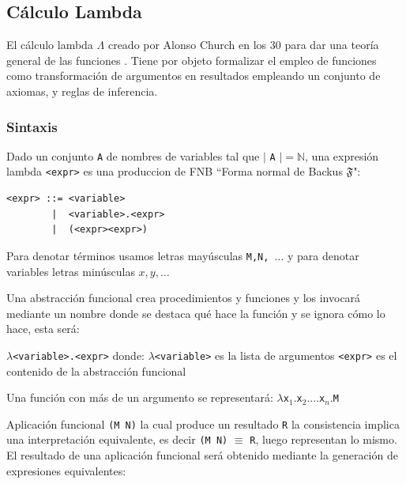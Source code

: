 \subsection{Cálculo Lambda}

El cálculo lambda $\Lambda$ creado por Alonso Church en los 30 para dar una teoría general de las funciones \cite{Bar1998}. Tiene por objeto formalizar el empleo de funciones como transformación de argumentos en resultados empleando un conjunto de axiomas, y reglas de inferencia.

\subsubsection{Sintaxis}

Dado un conjunto \texttt{A} de nombres de variables tal que $\vert$ 
\texttt{A} $\vert = \mathbb{N}$, una expresión lambda \texttt{<expr>} es una produccion de FNB ``Forma normal de Backus $\mathfrak{F}$":

\begin{verbatim}
<expr> ::= <variable> 
        |  <variable>.<expr> 
        |  (<expr><expr>)
\end{verbatim}

\begin{note}
Para denotar términos usamos letras mayúsculas \texttt{M,N, $\dots$} y para denotar variables letras  minúsculas \texttt{$x,y, \dots$}
\end{note}

Una abstracción funcional crea procedimientos y funciones y los invocará mediante un nombre donde se destaca qué hace la función y se ignora cómo lo hace, esta será:

\texttt{$\lambda$<variable>.<expr>}
donde:
\texttt{$\lambda$<variable>} es la lista de argumentos
\texttt{<expr>} es el contenido de la abstracción funcional

Una función con más de un argumento se representará:
\texttt{$\lambda $x$_1. $x$_2. \dots $x$_n. $M}

\begin{defn}\end{defn}

Aplicación funcional  \texttt{(M N)} la cual produce un resultado \texttt{R} la consistencia implica una interpretación equivalente,
es decir \texttt{(M N)} $\equiv$ \texttt{R}, luego representan lo mismo.
El resultado de una aplicación funcional será obtenido mediante la generación de expresiones equivalentes:

